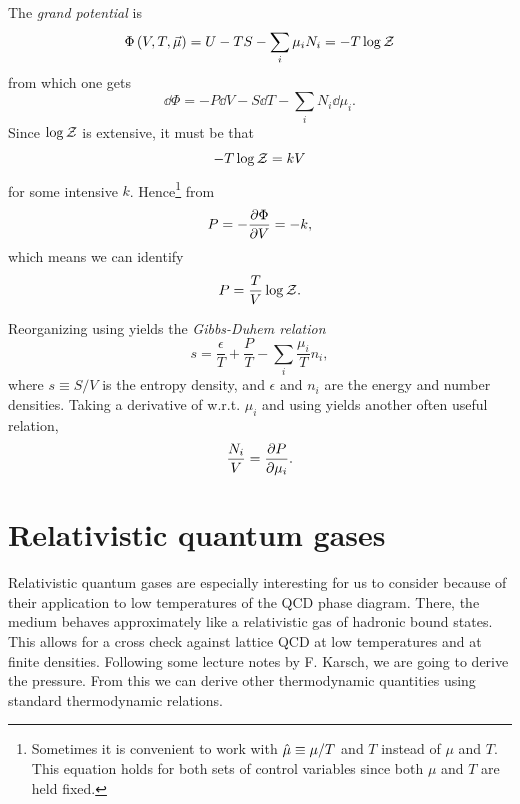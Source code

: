 The {\it grand potential} is
\begin{equation}\label{eq:grand}
  \Phi\left(V,T,\vec{\mu}\right)=U-TS-\sum_i\mu_i N_i=-T\log\mathcal{Z}
\end{equation}
from which one gets
\begin{equation}\label{eq:1stlawgrand}
  \dd\Phi=-P\dd V-S\dd T-\sum_i N_i\dd\mu_i.
\end{equation}
Since $\log\mathcal{Z}$ is extensive, it must be that
\begin{equation}
-T\log\mathcal{Z}=kV
\end{equation}
for some intensive $k$. Hence\footnote{Sometimes it is convenient to work
with $\hat{\mu}\equiv\mu/T$ and $T$ instead of $\mu$ and $T$. This equation
holds for both sets of control variables since both $\mu$ and $T$ are
held fixed.} from 
\begin{equation}
P=-\pdv{\Phi}{V}=-k,
\end{equation}
which means we can identify
\begin{equation}\label{eq:pgrand}
P=\frac{T}{V}\log\mathcal{Z}.
\end{equation}

Reorganizing  using 
yields the {\it Gibbs-Duhem relation}
\begin{equation}
  s=\frac{\epsilon}{T}+\frac{P}{T}-\sum_i\frac{\mu_i}{T}n_i,
\end{equation}
where $s\equiv S/V$ is the entropy density, and $\epsilon$ and $n_i$
are the energy and number densities.
Taking a derivative of  w.r.t. $\mu_i$ and
using  yields
another often useful relation,
\begin{equation}
  \frac{N_i}{V}=\pdv{P}{\mu_i}.
\end{equation}

\section{Relativistic quantum gases}

Relativistic quantum gases are especially interesting for us
to consider because of their
application to low temperatures of the QCD phase diagram. There, the medium
behaves approximately like a relativistic gas of hadronic bound states.
This allows for a cross check against lattice QCD at low temperatures
and at finite densities. Following some lecture notes by F. Karsch,
we are going to derive the
pressure. From this we can derive other thermodynamic quantities
using standard thermodynamic relations.

